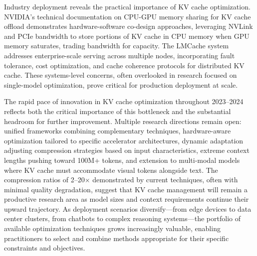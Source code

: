 Industry deployment reveals the practical importance of KV cache optimization. NVIDIA's technical documentation on CPU-GPU memory sharing for KV cache offload demonstrates hardware-software co-design approaches, leveraging NVLink and PCIe bandwidth to store portions of KV cache in CPU memory when GPU memory saturates, trading bandwidth for capacity. The LMCache system \citep{liu2024lmcache} addresses enterprise-scale serving across multiple nodes, incorporating fault tolerance, cost optimization, and cache coherence protocols for distributed KV cache. These systems-level concerns, often overlooked in research focused on single-model optimization, prove critical for production deployment at scale.

The rapid pace of innovation in KV cache optimization throughout 2023--2024 reflects both the critical importance of this bottleneck and the substantial headroom for further improvement. Multiple research directions remain open: unified frameworks combining complementary techniques, hardware-aware optimization tailored to specific accelerator architectures, dynamic adaptation adjusting compression strategies based on input characteristics, extreme context lengths pushing toward 100M+ tokens, and extension to multi-modal models where KV cache must accommodate visual tokens alongside text. The compression ratios of 2--20$\times$ demonstrated by current techniques, often with minimal quality degradation, suggest that KV cache management will remain a productive research area as model sizes and context requirements continue their upward trajectory. As deployment scenarios diversify---from edge devices to data center clusters, from chatbots to complex reasoning systems---the portfolio of available optimization techniques grows increasingly valuable, enabling practitioners to select and combine methods appropriate for their specific constraints and objectives.
